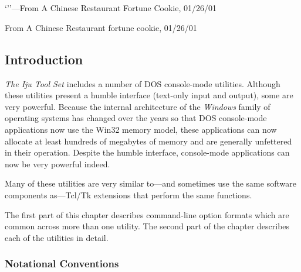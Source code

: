 
\chapter{\cdcmzerolongtitle{}}

\label{cdcm0}


`''---From A Chinese Restaurant 
         Fortune Cookie, 01/26/01

                   {From A Chinese Restaurant fortune cookie, 01/26/01}

\section{Introduction}
\label{cdcm0:sint0}

\emph{The Iju Tool Set} includes a number of DOS console-mode utilities.
Although these utilities present a humble interface (text-only input and output),
some are very powerful.  Because the internal architecture of the
\emph{Windows} family of
operating systems has changed over the years so that DOS console-mode
applications now use the Win32 memory model, these applications can now
allocate at least hundreds of megabytes of memory and are generally unfettered
in their operation.  Despite the humble interface, console-mode applications
can now be very powerful indeed.

Many of these utilities are very similar to---and sometimes use the
same software components as---Tcl/Tk extensions that perform the same
functions.

The first part of this chapter describes command-line option formats which
are common across more than one utility.  The second part of the chapter describes
each of the utilities in detail.



\subsection{Notational Conventions}
\label{ctin0:sccl0:snco0}


